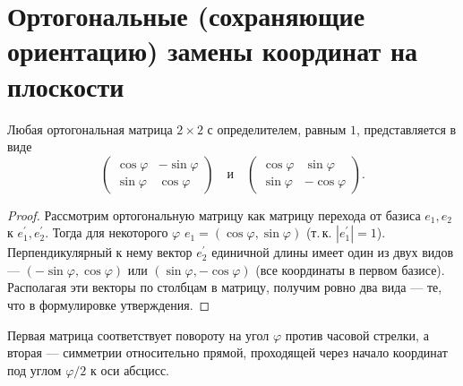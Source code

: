 \section{Ортогональные (сохраняющие ориентацию) замены координат на плоскости}

\begin{statement}
    Любая ортогональная матрица $2 \times 2$ с определителем, равным $1$, представляется в виде
    $$
    \begin{pmatrix}
        \cos\varphi & -\sin\varphi\\
        \sin\varphi & \cos\varphi
    \end{pmatrix}\quad\text{и}\quad
    \begin{pmatrix}
        \cos\varphi & \sin\varphi\\
        \sin\varphi & -\cos\varphi
    \end{pmatrix}.
    $$
\end{statement}

\begin{proof}
    Рассмотрим ортогональную матрицу как матрицу перехода от базиса $e_1, e_2$ к $e_1^\prime, e_2^\prime$. Тогда для некоторого $\varphi$ $e_1 = (\cos\varphi, \sin\varphi)$ (т.\,к. $|e_1^\prime| = 1$). Перпендикулярный к нему вектор $e_2^\prime$ единичной длины имеет один из двух видов --- $(-\sin\varphi, \cos\varphi)$ или $(\sin\varphi, -\cos\varphi)$ (все координаты в первом базисе). Располагая эти векторы по столбцам в матрицу, получим ровно два вида --- те, что в формулировке утверждения.
\end{proof}

\begin{orangebox}
    Первая матрица соответствует повороту на угол $\varphi$ против часовой стрелки, а вторая --- симметрии относительно прямой, проходящей через начало координат под углом $\varphi / 2$ к оси абсцисс.
\end{orangebox}

